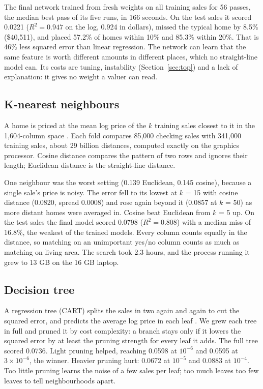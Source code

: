 \documentclass[sigconf,nonacm,10pt]{acmart}
\begin{document}
The final network trained from fresh weights on all training sales for 56 passes, the median best pass of its five runs, in 166 seconds. On the test sales it scored 0.0221 ($R^2 = 0.947$ on the log, 0.924 in dollars), missed the typical home by 8.5\% (\$40,511), and placed 57.2\% of homes within 10\% and 85.3\% within 20\%. That is 46\% less squared error than linear regression. The network can learn that the same feature is worth different amounts in different places, which no straight-line model can. Its costs are tuning, instability (Section~\ref{sec:top}) and a lack of explanation: it gives no weight a valuer can read.

\subsection{K-nearest neighbours}
A home is priced at the mean log price of the $k$ training sales closest to it in the 1,604-column space \cite{cover1967}. Each fold compares 85,000 checking sales with 341,000 training sales, about 29 billion distances, computed exactly on the graphics processor. Cosine distance compares the pattern of two rows and ignores their length; Euclidean distance is the straight-line distance.

One neighbour was the worst setting (0.139 Euclidean, 0.145 cosine), because a single sale's price is noisy. The error fell to its lowest at $k$ = 15 with cosine distance (0.0820, spread 0.0008) and rose again beyond it (0.0857 at $k$ = 50) as more distant homes were averaged in. Cosine beat Euclidean from $k$ = 5 up. On the test sales the final model scored 0.0798 ($R^2 = 0.808$) with a median miss of 16.8\%, the weakest of the trained models. Every column counts equally in the distance, so matching on an unimportant yes/no column counts as much as matching on living area. The search took 2.3 hours, and the process running it grew to 13 GB on the 16 GB laptop.

\subsection{Decision tree}
A regression tree (CART) splits the sales in two again and again to cut the squared error, and predicts the average log price in each leaf \cite{breiman1984}. We grew each tree in full and pruned it by cost complexity: a branch stays only if it lowers the squared error by at least the pruning strength for every leaf it adds. The full tree scored 0.0736. Light pruning helped, reaching 0.0598 at $10^{-6}$ and 0.0595 at $3\times10^{-6}$, the winner. Heavier pruning hurt: 0.0672 at $10^{-5}$ and 0.0883 at $10^{-4}$. Too little pruning learns the noise of a few sales per leaf; too much leaves too few leaves to tell neighbourhoods apart.
\end{document}
